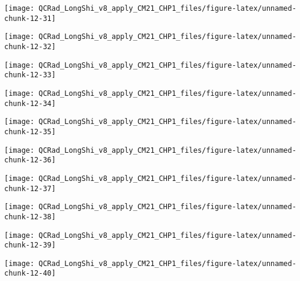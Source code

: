 \documentclass[
  10pt,
  a4paper,oneside]{article}
\begin{document}
\begin{center}\texttt{[image: QCRad\_LongShi\_v8\_apply\_CM21\_CHP1\_files/figure-latex/unnamed-chunk-12-31]} \end{center}

\begin{center}\texttt{[image: QCRad\_LongShi\_v8\_apply\_CM21\_CHP1\_files/figure-latex/unnamed-chunk-12-32]} \end{center}

\begin{center}\texttt{[image: QCRad\_LongShi\_v8\_apply\_CM21\_CHP1\_files/figure-latex/unnamed-chunk-12-33]} \end{center}

\begin{center}\texttt{[image: QCRad\_LongShi\_v8\_apply\_CM21\_CHP1\_files/figure-latex/unnamed-chunk-12-34]} \end{center}

\begin{center}\texttt{[image: QCRad\_LongShi\_v8\_apply\_CM21\_CHP1\_files/figure-latex/unnamed-chunk-12-35]} \end{center}

\begin{center}\texttt{[image: QCRad\_LongShi\_v8\_apply\_CM21\_CHP1\_files/figure-latex/unnamed-chunk-12-36]} \end{center}

\begin{center}\texttt{[image: QCRad\_LongShi\_v8\_apply\_CM21\_CHP1\_files/figure-latex/unnamed-chunk-12-37]} \end{center}

\begin{center}\texttt{[image: QCRad\_LongShi\_v8\_apply\_CM21\_CHP1\_files/figure-latex/unnamed-chunk-12-38]} \end{center}

\begin{center}\texttt{[image: QCRad\_LongShi\_v8\_apply\_CM21\_CHP1\_files/figure-latex/unnamed-chunk-12-39]} \end{center}

\begin{center}\texttt{[image: QCRad\_LongShi\_v8\_apply\_CM21\_CHP1\_files/figure-latex/unnamed-chunk-12-40]} \end{center}
\end{document}
